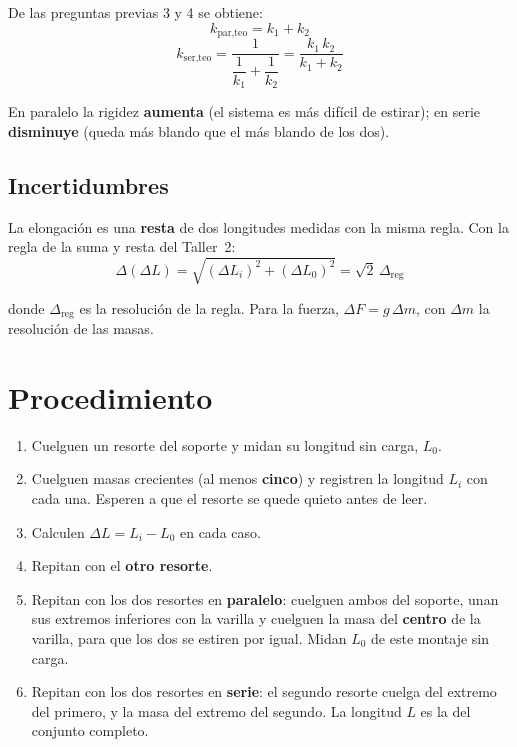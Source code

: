 \documentclass[11pt, letterpaper]{article}
\begin{document}
	De las preguntas previas 3 y 4 se obtiene:
	\begin{equation}
		k_{\text{par,teo}} = k_1 + k_2
		\label{eq:paralelo}
	\end{equation}
	\begin{equation}
		k_{\text{ser,teo}} = \frac{1}{\dfrac{1}{k_1} + \dfrac{1}{k_2}}
		= \frac{k_1\,k_2}{k_1 + k_2}
		\label{eq:serie}
	\end{equation}
	
	\noindent
	En paralelo la rigidez \textbf{aumenta} (el sistema es más difícil de
	estirar); en serie \textbf{disminuye} (queda más blando que el más blando de
	los dos).
	
	\subsection*{Incertidumbres}
	
	La elongación es una \textbf{resta} de dos longitudes medidas con la misma
	regla. Con la regla de la suma y resta del Taller~2:
	\begin{equation}
		\Delta(\Delta L) = \sqrt{(\Delta L_i)^2 + (\Delta L_0)^2}
		= \sqrt{2}\,\Delta_{\text{reg}}
		\label{eq:dDL}
	\end{equation}
	
	\noindent
	donde $\Delta_{\text{reg}}$ es la resolución de la regla. Para la fuerza,
	$\Delta F = g\,\Delta m$, con $\Delta m$ la resolución de las masas.
	
	\section{Procedimiento}
	
	\begin{enumerate}
		\item Cuelguen un resorte del soporte y midan su longitud sin carga, $L_0$.
		\item Cuelguen masas crecientes (al menos \textbf{cinco}) y registren la
		longitud $L_i$ con cada una. Esperen a que el resorte se quede quieto
		antes de leer.
		\item Calculen $\Delta L = L_i - L_0$ en cada caso.
		\item Repitan con el \textbf{otro resorte}.
		\item Repitan con los dos resortes en \textbf{paralelo}: cuelguen ambos
		del soporte, unan sus extremos inferiores con la varilla y cuelguen la
		masa del \textbf{centro} de la varilla, para que los dos se estiren por
		igual. Midan $L_0$ de este montaje sin carga.
		\item Repitan con los dos resortes en \textbf{serie}: el segundo resorte
		cuelga del extremo del primero, y la masa del extremo del segundo.
		La longitud $L$ es la del conjunto completo.
	\end{enumerate}
	
\end{document}
